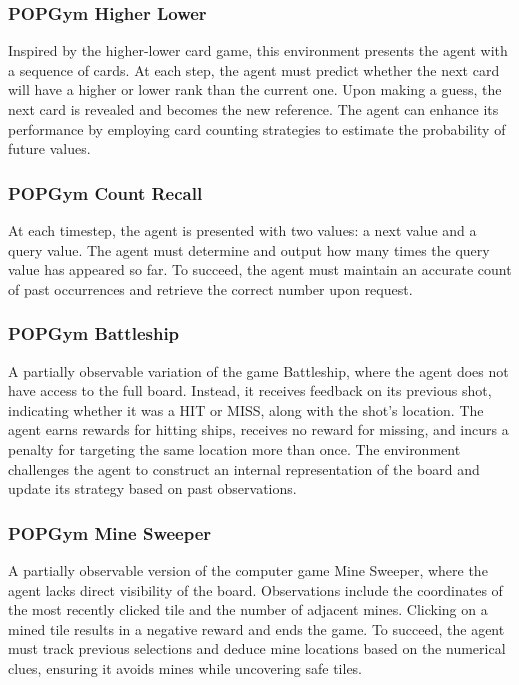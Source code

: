 \subsubsection{POPGym Higher Lower}
Inspired by the higher-lower card game, this environment presents the agent with a sequence of cards. At each step, the agent must predict whether the next card will have a higher or lower rank than the current one. Upon making a guess, the next card is revealed and becomes the new reference. The agent can enhance its performance by employing card counting strategies to estimate the probability of future values.

\subsubsection{POPGym Count Recall}
At each timestep, the agent is presented with two values: a next value and a query value. The agent must determine and output how many times the query value has appeared so far. To succeed, the agent must maintain an accurate count of past occurrences and retrieve the correct number upon request. 

\subsubsection{POPGym Battleship}
A partially observable variation of the game Battleship, where the agent does not have access to the full board. Instead, it receives feedback on its previous shot, indicating whether it was a HIT or MISS, along with the shot's location. The agent earns rewards for hitting ships, receives no reward for missing, and incurs a penalty for targeting the same location more than once. The environment challenges the agent to construct an internal representation of the board and update its strategy based on past observations.

\subsubsection{POPGym Mine Sweeper}
A partially observable version of the computer game Mine Sweeper, where the agent lacks direct visibility of the board. Observations include the coordinates of the most recently clicked tile and the number of adjacent mines. Clicking on a mined tile results in a negative reward and ends the game. To succeed, the agent must track previous selections and deduce mine locations based on the numerical clues, ensuring it avoids mines while uncovering safe tiles.

